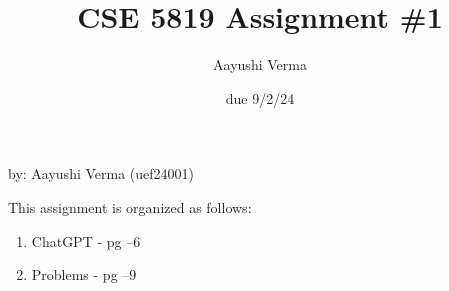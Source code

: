 \documentclass{article}
\title{CSE 5819 Assignment \#1}
\author{Aayushi Verma}
\date{due 9/2/24}
\begin{document}
\maketitle
\begin{center}
    by: Aayushi Verma (uef24001)
\end{center}

This assignment is organized as follows:

\begin{enumerate}
    \item ChatGPT - pg \pageref{chatgpt_start}--6%
    \item Problems - pg \pageref{problems_start}--9%
\end{enumerate}

\label{chatgpt_start}
 
\label{chatgpt_end}

\label{problems_start}
  
\label{problems_end}
\end{document}
